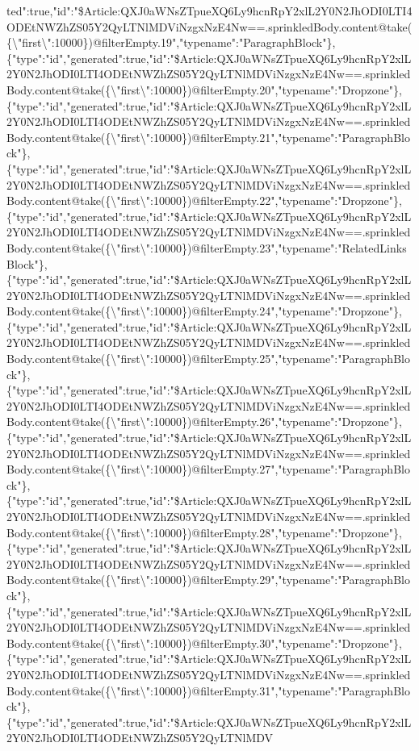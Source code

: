 ted":true,"id":"\$Article:QXJ0aWNsZTpueXQ6Ly9hcnRpY2xlL2Y0N2JhODI0LTI4ODEtNWZhZS05Y2QyLTNlMDViNzgxNzE4Nw==.sprinkledBody.content@take(\{\textbackslash{}"first\textbackslash{}":10000\})@filterEmpty.19","typename":"ParagraphBlock"\},\{"type":"id","generated":true,"id":"\$Article:QXJ0aWNsZTpueXQ6Ly9hcnRpY2xlL2Y0N2JhODI0LTI4ODEtNWZhZS05Y2QyLTNlMDViNzgxNzE4Nw==.sprinkledBody.content@take(\{\textbackslash{}"first\textbackslash{}":10000\})@filterEmpty.20","typename":"Dropzone"\},\{"type":"id","generated":true,"id":"\$Article:QXJ0aWNsZTpueXQ6Ly9hcnRpY2xlL2Y0N2JhODI0LTI4ODEtNWZhZS05Y2QyLTNlMDViNzgxNzE4Nw==.sprinkledBody.content@take(\{\textbackslash{}"first\textbackslash{}":10000\})@filterEmpty.21","typename":"ParagraphBlock"\},\{"type":"id","generated":true,"id":"\$Article:QXJ0aWNsZTpueXQ6Ly9hcnRpY2xlL2Y0N2JhODI0LTI4ODEtNWZhZS05Y2QyLTNlMDViNzgxNzE4Nw==.sprinkledBody.content@take(\{\textbackslash{}"first\textbackslash{}":10000\})@filterEmpty.22","typename":"Dropzone"\},\{"type":"id","generated":true,"id":"\$Article:QXJ0aWNsZTpueXQ6Ly9hcnRpY2xlL2Y0N2JhODI0LTI4ODEtNWZhZS05Y2QyLTNlMDViNzgxNzE4Nw==.sprinkledBody.content@take(\{\textbackslash{}"first\textbackslash{}":10000\})@filterEmpty.23","typename":"RelatedLinksBlock"\},\{"type":"id","generated":true,"id":"\$Article:QXJ0aWNsZTpueXQ6Ly9hcnRpY2xlL2Y0N2JhODI0LTI4ODEtNWZhZS05Y2QyLTNlMDViNzgxNzE4Nw==.sprinkledBody.content@take(\{\textbackslash{}"first\textbackslash{}":10000\})@filterEmpty.24","typename":"Dropzone"\},\{"type":"id","generated":true,"id":"\$Article:QXJ0aWNsZTpueXQ6Ly9hcnRpY2xlL2Y0N2JhODI0LTI4ODEtNWZhZS05Y2QyLTNlMDViNzgxNzE4Nw==.sprinkledBody.content@take(\{\textbackslash{}"first\textbackslash{}":10000\})@filterEmpty.25","typename":"ParagraphBlock"\},\{"type":"id","generated":true,"id":"\$Article:QXJ0aWNsZTpueXQ6Ly9hcnRpY2xlL2Y0N2JhODI0LTI4ODEtNWZhZS05Y2QyLTNlMDViNzgxNzE4Nw==.sprinkledBody.content@take(\{\textbackslash{}"first\textbackslash{}":10000\})@filterEmpty.26","typename":"Dropzone"\},\{"type":"id","generated":true,"id":"\$Article:QXJ0aWNsZTpueXQ6Ly9hcnRpY2xlL2Y0N2JhODI0LTI4ODEtNWZhZS05Y2QyLTNlMDViNzgxNzE4Nw==.sprinkledBody.content@take(\{\textbackslash{}"first\textbackslash{}":10000\})@filterEmpty.27","typename":"ParagraphBlock"\},\{"type":"id","generated":true,"id":"\$Article:QXJ0aWNsZTpueXQ6Ly9hcnRpY2xlL2Y0N2JhODI0LTI4ODEtNWZhZS05Y2QyLTNlMDViNzgxNzE4Nw==.sprinkledBody.content@take(\{\textbackslash{}"first\textbackslash{}":10000\})@filterEmpty.28","typename":"Dropzone"\},\{"type":"id","generated":true,"id":"\$Article:QXJ0aWNsZTpueXQ6Ly9hcnRpY2xlL2Y0N2JhODI0LTI4ODEtNWZhZS05Y2QyLTNlMDViNzgxNzE4Nw==.sprinkledBody.content@take(\{\textbackslash{}"first\textbackslash{}":10000\})@filterEmpty.29","typename":"ParagraphBlock"\},\{"type":"id","generated":true,"id":"\$Article:QXJ0aWNsZTpueXQ6Ly9hcnRpY2xlL2Y0N2JhODI0LTI4ODEtNWZhZS05Y2QyLTNlMDViNzgxNzE4Nw==.sprinkledBody.content@take(\{\textbackslash{}"first\textbackslash{}":10000\})@filterEmpty.30","typename":"Dropzone"\},\{"type":"id","generated":true,"id":"\$Article:QXJ0aWNsZTpueXQ6Ly9hcnRpY2xlL2Y0N2JhODI0LTI4ODEtNWZhZS05Y2QyLTNlMDViNzgxNzE4Nw==.sprinkledBody.content@take(\{\textbackslash{}"first\textbackslash{}":10000\})@filterEmpty.31","typename":"ParagraphBlock"\},\{"type":"id","generated":true,"id":"\$Article:QXJ0aWNsZTpueXQ6Ly9hcnRpY2xlL2Y0N2JhODI0LTI4ODEtNWZhZS05Y2QyLTNlMDV